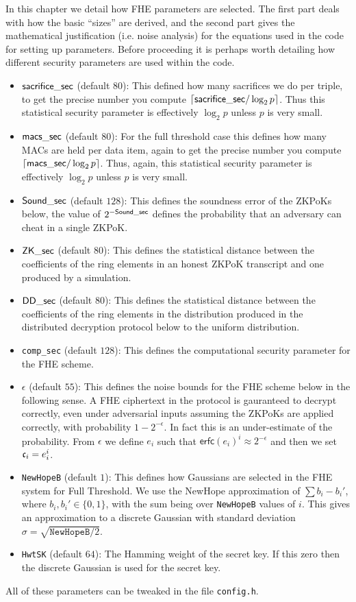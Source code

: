 \label{sec:fhe}
In this chapter we detail how FHE parameters are selected.
The first part deals with how the basic ``sizes'' are derived,
and the second part gives the mathematical justification (i.e.
noise analysis) for the equations used in the code for setting
up parameters.
Before proceeding it is perhaps worth detailing how
different security parameters are used within the code.

\begin{itemize}
\item $\mathsf{sacrifice\_sec}$ (default $80$): 
This defined how many sacrifices we do per triple, 
to get the precise number you compute ${\lceil \mathsf{sacrifice\_sec}/\log_2 p \rceil}$.
Thus this statistical security parameter is effectively
$\log_2 p$ unless $p$ is very small.
\item $\mathsf{macs\_sec}$ (default $80$):
For the full threshold case this defines how many MACs are held
per data item, again to get the precise number you compute 
${\lceil \mathsf{macs\_sec}/\log_2 p \rceil}$.
Thus, again, this statistical security parameter is effectively
$\log_2 p$ unless $p$ is very small.
\item $\mathsf{Sound\_sec}$ (default $128$):
This defines the soundness error of the ZKPoKs below,
the value of $2^{-\mathsf{Sound\_sec}}$ defines the probability
that an adversary can cheat in a single ZKPoK.
\item $\mathsf{ZK\_sec}$ (default $80$): 
This defines the statistical distance between the 
coefficients of the ring elements in an honest ZKPoK
transcript and one produced by a simulation.
\item $\mathsf{DD\_sec}$ (default $80$):
This defines the statistical distance between the 
coefficients of the ring elements in the distribution produced
in the distributed decryption protocol below to the uniform
distribution.
\item \verb+comp_sec+ (default $128$):
This defines the computational security parameter for the
FHE scheme. 
\item $\epsilon$ (default $55$):
This defines the noise bounds for the FHE scheme below in
the following sense.
A FHE ciphertext in the protocol is gauranteed to decrypt
correctly, even under adversarial inputs assuming the
ZKPoKs are applied correctly, with probability $1-2^{-\epsilon}$.
In fact this is an under-estimate of the probability.
From $\epsilon$ we define $e_i$ such that 
$\mathsf{erfc}(e_i)^i \approx 2^{-\epsilon}$ and then we set $\mathfrak{c}_i = e_i^i$.
\item \verb+NewHopeB+ (default $1$):
This defines how Gaussians are selected in the FHE system for
Full Threshold. We use the NewHope approximation of
$\sum b_i - b_i'$, where $b_i, b_i' \in \{0,1\}$,
with the sum being over \verb+NewHopeB+ values of $i$.
This gives an approximation to a discrete Gaussian with
standard deviation $\sigma = \sqrt{\texttt{NewHopeB}/2}$.
\item \verb+HwtSK+ (default $64$):
The Hamming weight of the secret key. If this zero
then the discrete Gaussian is used for the secret key.
\end{itemize}
All of these parameters can be tweaked in the file
\verb+config.h+.

